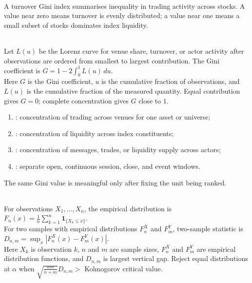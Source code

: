 \begin{definition} \\
A turnover Gini index summarises inequality in trading activity across stocks. A value near zero means turnover is evenly distributed; a value near one means a small subset of stocks dominates index liquidity.
\end{definition}

\begin{model} \\
Let $L(u)$ be the Lorenz curve for venue share, turnover, or actor activity after observations are ordered from smallest to largest contribution. The Gini coefficient is $G=1-2\int_0^1 L(u)\,du$.\\
Here $G$ is the Gini coefficient, $u$ is the cumulative fraction of observations, and $L(u)$ is the cumulative fraction of the measured quantity. Equal contribution gives $G=0$; complete concentration gives $G$ close to $1$.
\end{model}

\begin{taxonomy} 
\begin{enumerate}[label=\roman*.]
\setlength{\itemsep}{0pt}
\item {}: concentration of trading across venues for one asset or universe;
\item {}: concentration of liquidity across index constituents;
\item {}: concentration of messages, trades, or liquidity supply across actors;
\item {}: separate open, continuous session, close, and event windows.
\end{enumerate}
The same Gini value is meaningful only after fixing the unit being ranked.
\end{taxonomy}

\begin{model} \\
For observations $X_1,\ldots,X_n$, the empirical distribution is $F_n(x)=\frac{1}{n}\sum_{k=1}^{n}\mathbf{1}_{\{X_k\leq x\}}$.\\
For two samples with empirical distributions $F_n^X$ and $F_m^Y$, two-sample statistic is $D_{n,m}=\sup_x\left|F_n^X(x)-F_m^Y(x)\right|$.\\
Here $X_k$ is observation $k$, $n$ and $m$ are sample sizes, $F_n^X$ and $F_m^Y$ are empirical distribution functions, and $D_{n,m}$ is largest vertical gap. Reject equal distributions at $\alpha$ when $\sqrt{\frac{nm}{n+m}}D_{n,m} > $ Kolmogorov critical value.
\end{model}


